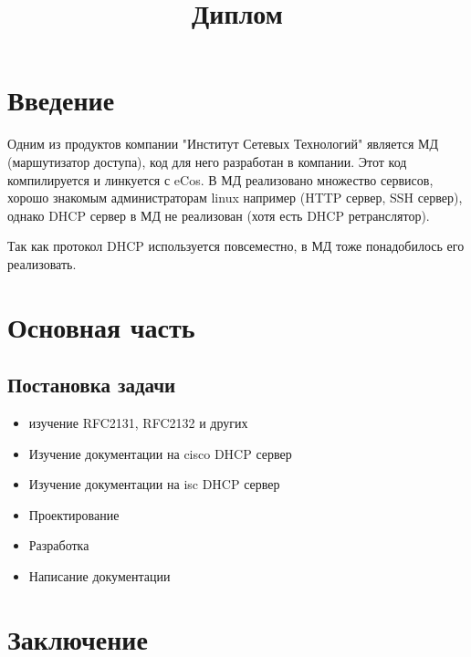 \documentclass[12pt]{article}
\title{Диплом}
\begin{document}
\maketitle

\section{Введение}


Одним из продуктов компании "Институт Сетевых Технологий" является МД (маршутизатор доступа), код для него разработан в компании. Этот код компилируется и линкуется с eCos. В МД реализовано множество сервисов, хорошо знакомым администраторам linux например (HTTP сервер, SSH сервер), однако DHCP сервер в МД не реализован (хотя есть DHCP ретранслятор).

Так как протокол DHCP используется повсеместно, в МД тоже понадобилось его реализовать.

\section{Основная часть}

\subsection{Постановка задачи}

\begin{itemize}
    \item изучение RFC2131, RFC2132 и других
    \item Изучение документации на cisco DHCP сервер
    \item Изучение документации на isc DHCP сервер
    \item Проектирование
    \item Разработка
    \item Написание документации
\end{itemize}

\section{Заключение}
\end{document}
